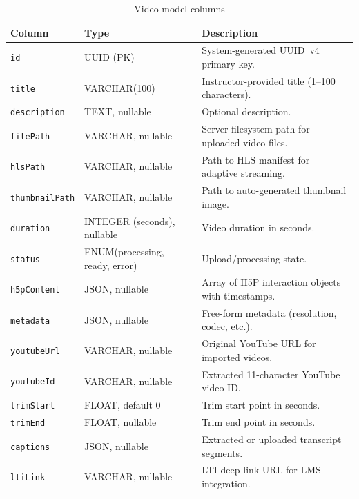 \begin{table}[H]
  \centering
  \caption{Video model columns}
  \label{tab:video_model}
  \begin{tabularx}{\linewidth}{llX}
    \toprule
    \textbf{Column}         & \textbf{Type}                     & \textbf{Description} \\
    \midrule
    \texttt{id}             & UUID (PK)                         & System-generated UUID~v4 primary key. \\
    \texttt{title}          & VARCHAR(100)                      & Instructor-provided title (1--100 characters). \\
    \texttt{description}    & TEXT, nullable                    & Optional description. \\
    \texttt{filePath}       & VARCHAR, nullable                 & Server filesystem path for uploaded video files. \\
    \texttt{hlsPath}        & VARCHAR, nullable                 & Path to HLS manifest for adaptive streaming. \\
    \texttt{thumbnailPath}  & VARCHAR, nullable                 & Path to auto-generated thumbnail image. \\
    \texttt{duration}       & INTEGER (seconds), nullable       & Video duration in seconds. \\
    \texttt{status}         & ENUM(processing, ready, error)    & Upload/processing state. \\
    \texttt{h5pContent}     & JSON, nullable                    & Array of H5P interaction objects with timestamps. \\
    \texttt{metadata}       & JSON, nullable                    & Free-form metadata (resolution, codec, etc.). \\
    \texttt{youtubeUrl}     & VARCHAR, nullable                 & Original YouTube URL for imported videos. \\
    \texttt{youtubeId}      & VARCHAR, nullable                 & Extracted 11-character YouTube video ID. \\
    \texttt{trimStart}      & FLOAT, default 0                  & Trim start point in seconds. \\
    \texttt{trimEnd}        & FLOAT, nullable                   & Trim end point in seconds. \\
    \texttt{captions}       & JSON, nullable                    & Extracted or uploaded transcript segments. \\
    \texttt{ltiLink}        & VARCHAR, nullable                 & LTI deep-link URL for LMS integration. \\

\end{tabularx}
\end{table}
